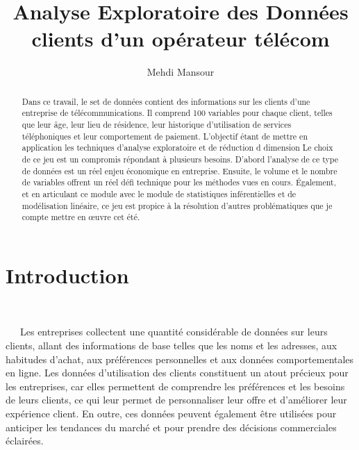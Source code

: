 \documentclass[]{imsart}
\numberwithin{equation}{section}
\theoremstyle{plain}
\begin{document}
\begin{frontmatter}

\title{Analyse Exploratoire des Données clients d'un opérateur télécom}

\begin{aug}
\author{Mehdi Mansour}

\address[addr1]{L3\_Data\_Science, ICOM, 5 Av. Pierre Mendès France, 69500 Bron \ifstrequal{addr1}{addr1}{}{}
}%


\end{aug}

\begin{abstract}
Dans ce travail, le set de données contient des informations sur les clients d'une entreprise de télécommunications. Il comprend 100 variables pour chaque client, telles que leur âge, leur lieu de résidence, leur historique d'utilisation de services téléphoniques et leur comportement de paiement. L'objectif étant de mettre en application les techniques d'analyse exploratoire et de réduction d dimension
Le choix de ce jeu est un compromis répondant à plusieurs besoins. D'abord l'analyse de ce type de données est un réel enjeu économique en entreprise. Ensuite, le volume et le nombre de variables offrent un réel défi technique pour les méthodes vues en cours. Également, et en articulant ce module avec le module de statistiques inférentielles et de modélisation linéaire, ce jeu est propice à la résolution d'autres problématiques que je compte mettre en œuvre cet été.
\end{abstract}


 \begin{keyword}      \end{keyword}
\end{frontmatter}

\hypertarget{introduction}{%
\section{Introduction}\label{introduction}}

~

~~~Les entreprises collectent une quantité considérable de données sur leurs clients, allant des informations de base telles que les noms et les adresses, aux habitudes d'achat, aux préférences personnelles et aux données comportementales en ligne. Les données d'utilisation des clients constituent un atout précieux pour les entreprises, car elles permettent de comprendre les préférences et les besoins de leurs clients, ce qui leur permet de personnaliser leur offre et d'améliorer leur expérience client. En outre, ces données peuvent également être utilisées pour anticiper les tendances du marché et pour prendre des décisions commerciales éclairées.
\end{document}
